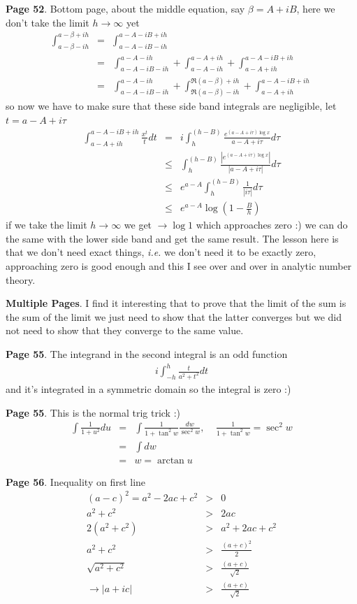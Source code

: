 \documentclass[aps,preprint,preprintnumbers,nofootinbib,showpacs,prd]{revtex4-1}
\newcommand{\ie}{{\it i.e.} }
\newcommand{\nbea}{\begin{eqnarray*}}
\newcommand{\neea}{\end{eqnarray*}}
\begin{document}
{\bf Page 52}. Bottom page, about the middle equation, say $\beta = A + iB$, here we don't take the limit $h\to\infty$ yet
%
\nbea
\int_{a - \beta - ih}^{a - \beta + ih} & = & \int_{a - A - iB - ih}^{a - A - iB + ih} \\
& = & \int_{a - A - iB - ih}^{a - A - ih} + \int_{a - A - ih}^{a - A + ih} + \int_{a - A + ih}^{a - A -iB + ih} \\
& = & \int_{a - A - iB - ih}^{a - A - ih} + \int_{\Re{(a - \beta)} - ih}^{\Re{(a - \beta)} + ih} + \int_{a - A + ih}^{a - A -iB + ih} 
\neea
%
so now we have to make sure that these side band integrals are negligible, let $t = a - A + i\tau$
%
\nbea
\int_{a - A + ih}^{a - A -iB + ih}  \frac{x^t}{t} dt & = & i\int_{h}^{(h - B)} \frac{e^{(a-A+i\tau)\log x}}{a -  A + i\tau} d\tau \\
& \le & \int_{h}^{(h - B)} \frac{|e^{(a-A+i\tau)\log x}|}{|a -  A + i\tau|} d\tau \\
& \le & e^{a - A} \int_{h}^{(h - B)} \frac{1}{|i\tau|} d\tau \\
& \le & e^{a - A} \log (1 - \frac{B}{h})
\neea
%
if we take the limit $h\to\infty$ we get $\to\log 1$ which approaches zero :) we can do the same with the lower side band and get the same result. The lesson here is that we don't need exact things, \ie we don't need it to be exactly zero, approaching zero is good enough and this I see over and over in analytic number theory.

{\bf Multiple Pages}. I find it interesting that to prove that the limit of the sum is the sum of the limit we just need to show that the latter converges but we did not need to show that they converge to the same value.

{\bf Page 55}. The integrand in the second integral is an odd function
%
\nbea
i\int_{-h}^{h} \frac{t}{a^2 + t^2} dt
\neea
%
and it's integrated in a symmetric domain so the integral is zero :)

{\bf Page 55}. This is the normal trig trick :)
%
\nbea
\int \frac{1}{1+u^2} du & = & \int \frac{1}{1 + \tan^2 w} \frac{dw}{\sec^2 w}, ~~~~~ \frac{1}{1 + \tan^2 w} = \sec^2 w \\
& = & \int dw \\
& = & w = \arctan u
\neea
%

{\bf Page 56}. Inequality on first line
%
\nbea
(a - c)^2 = a^2 - 2ac + c^2 & > & 0 \\
a^2 + c^2 & > & 2ac \\
2(a^2 + c^2) & > & a^2 + 2ac + c^2 \\
a^2 + c^2 & > & \frac{(a+c)^2}{2} \\
\sqrt{a^2 + c^2} & > & \frac{(a+c)}{\sqrt{2}} \\
\to |a + ic| & > & \frac{(a+c)}{\sqrt{2}}
\neea
%
\end{document}
